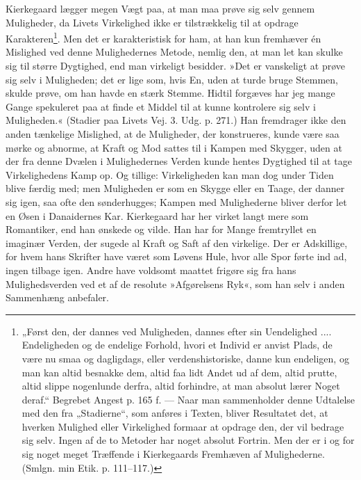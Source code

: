 \documentclass[12pt,a4paper,openany]{book}
\newcommand{\opage}[1]{\marginnote{\footnotesize\textit{[#1]}}}
\begin{document}
Kierkegaard lægger megen Vægt paa, at man maa
prøve sig selv gennem Muligheder, da Livets Virkelighed
ikke er tilstrækkelig til at opdrage Karakteren\footnote{„Først den, der dannes ved Muligheden, dannes efter sin Uendelighed .... Endeligheden og de endelige Forhold, hvori et Individ er anvist Plads, de være nu smaa og dagligdags, eller verdenshistoriske, danne kun endeligen, og man kan altid besnakke dem, altid faa lidt Andet ud af dem, altid prutte, altid slippe nogenlunde derfra, altid forhindre, at man absolut lærer Noget deraf.“ Begrebet Angest p. 165 f. --- Naar man sammenholder denne Udtalelse med den fra „Stadierne“, som anføres i Texten, bliver Resultatet det, at hverken Mulighed eller Virkelighed formaar at opdrage den, der vil bedrage sig selv. Ingen af de to Metoder har noget absolut Fortrin. Men der er i og for sig noget meget Træffende i Kierkegaards Fremhæven af Mulighederne. (Smlgn. min Etik. p. 111--117.)}. Men
det er karakteristisk for ham, at han kun fremhæver én
Mislighed ved denne Mulighedernes Metode, nemlig den,
\opage{51}at man let kan skulke sig til større Dygtighed, end man
virkeligt besidder. »Det er vanskeligt at prøve sig selv
i Muligheden; det er lige som, hvis En, uden at turde
bruge Stemmen, skulde prøve, om han havde en stærk
Stemme. Hidtil forgæves har jeg mange Gange spekuleret
paa at finde et Middel til at kunne kontrolere sig
selv i Muligheden.« (Stadier paa Livets Vej. 3. Udg. p. 271.)
Han fremdrager ikke den anden tænkelige Mislighed, at
de Muligheder, der konstrueres, kunde være saa mørke
og abnorme, at Kraft og Mod sattes til i Kampen med
Skygger, uden at der fra denne Dvælen i Mulighedernes
Verden kunde hentes Dygtighed til at tage Virkelighedens
Kamp op. Og tillige: Virkeligheden kan man dog under
Tiden blive færdig med; men Muligheden er som en
Skygge eller en Taage, der danner sig igen, saa ofte
den sønderhugges; Kampen med Mulighederne bliver derfor
let en Øsen i Danaidernes Kar. Kierkegaard har
her virket langt mere som Romantiker, end han ønskede
og vilde. Han har for Mange fremtryllet en imaginær
Verden, der sugede al Kraft og Saft af den virkelige.
Der er Adskillige, for hvem hans Skrifter have været
som Løvens Hule, hvor alle Spor førte ind ad, ingen tilbage
igen. Andre have voldsomt maattet frigøre sig fra
hans Mulighedsverden ved et af de resolute »Afgørelsens
Ryk«, som han selv i anden Sammenhæng anbefaler.
\end{document}
